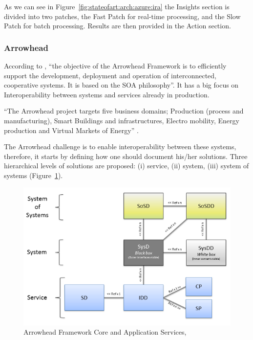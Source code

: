 As we can see in Figure~\ref{fig:stateofart:arch:azure:ira} the Insights section is divided into two patches, the Fast Patch for real-time processing, and the Slow Patch for batch processing. Results are then provided in the Action section.

\subsubsection{Arrowhead}
\label{subsubsec:stateofart:arch:arrrowhead}

According to \cite{varga2017making}, ``the objective of the Arrowhead Framework is to efficiently support the development, deployment and operation of interconnected, cooperative systems. It is based on the \gls{SOA} philosophy''. It has a big focus on Interoperability between systems and services already in production.

``The Arrowhead project targets five business domains; Production (process and manufacturing), Smart Buildings and infrastructures, Electro mobility, Energy production and Virtual Markets of Energy'' \parencite{blomstedt2014arrowhead}.

The Arrowhead challenge is to enable interoperability between these systems, therefore, it starts by defining how one should document his/her solutions. Three hierarchical levels of solutions are proposed: (i) service, (ii) system, (iii) system of systems (Figure~\ref{fig:stateofart:arch:arrowhead:levels}).

\begin{figure}[H]
    \centering
    \includegraphics[scale=0.6]{assets/figures/arrowhead-levels.png}
    \caption[Arrowhead Framework Core and Application Services]{Arrowhead Framework Core and Application Services, \cite{blomstedt2014arrowhead}}
    \label{fig:stateofart:arch:arrowhead:levels}
\end{figure}


